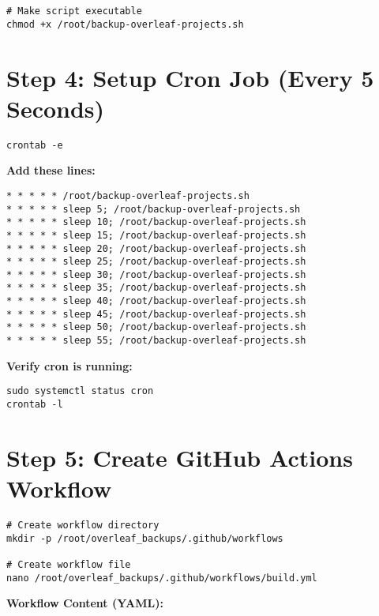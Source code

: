 \begin{verbatim}
# Make script executable
chmod +x /root/backup-overleaf-projects.sh
\end{verbatim}

\section{Step 4: Setup Cron Job (Every 5 Seconds)}

\begin{verbatim}
crontab -e
\end{verbatim}

\textbf{Add these lines:}

\begin{verbatim}
* * * * * /root/backup-overleaf-projects.sh
* * * * * sleep 5; /root/backup-overleaf-projects.sh
* * * * * sleep 10; /root/backup-overleaf-projects.sh
* * * * * sleep 15; /root/backup-overleaf-projects.sh
* * * * * sleep 20; /root/backup-overleaf-projects.sh
* * * * * sleep 25; /root/backup-overleaf-projects.sh
* * * * * sleep 30; /root/backup-overleaf-projects.sh
* * * * * sleep 35; /root/backup-overleaf-projects.sh
* * * * * sleep 40; /root/backup-overleaf-projects.sh
* * * * * sleep 45; /root/backup-overleaf-projects.sh
* * * * * sleep 50; /root/backup-overleaf-projects.sh
* * * * * sleep 55; /root/backup-overleaf-projects.sh
\end{verbatim}

\textbf{Verify cron is running:}

\begin{verbatim}
sudo systemctl status cron
crontab -l
\end{verbatim}

\section{Step 5: Create GitHub Actions Workflow}

\begin{verbatim}
# Create workflow directory
mkdir -p /root/overleaf_backups/.github/workflows

# Create workflow file
nano /root/overleaf_backups/.github/workflows/build.yml
\end{verbatim}

\textbf{Workflow Content (YAML):}


